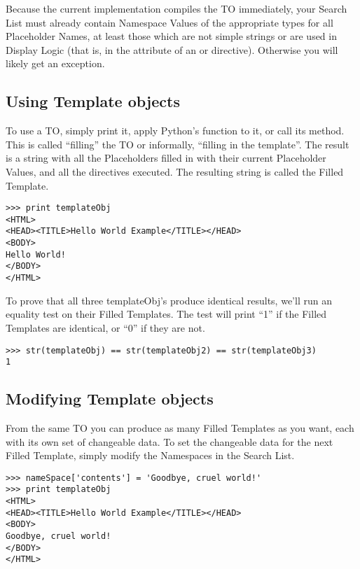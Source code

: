 Because the current implementation compiles the TO immediately, your Search 
List must already contain Namespace Values of the appropriate types for all
Placeholder Names, at least those which are not simple strings or are used
in Display Logic (that is, in the attribute of an  or 
directive).  Otherwise you will likely get an exception.


\subsection{Using Template objects}

To use a TO, simply print it, apply Python's
 function to it, or call its  method.  This is
called ``filling'' the TO or informally,  ``filling in the template''.  The
result is a string with all the Placeholders filled in with their current
Placeholder Values, and all the directives executed.  The resulting string is
called the Filled Template.

\begin{verbatim}
>>> print templateObj
<HTML>
<HEAD><TITLE>Hello World Example</TITLE></HEAD>
<BODY>
Hello World!
</BODY>
</HTML>
\end{verbatim}

To prove that all three templateObj's produce identical results, we'll run an
equality test on their Filled Templates.  The test will print ``1'' if the
Filled Templates are identical, or ``0'' if they are not.

\begin{verbatim}
>>> str(templateObj) == str(templateObj2) == str(templateObj3)
1
\end{verbatim}


\subsection{Modifying Template objects}

From the same TO you can produce as many Filled Templates as you
want, each with its own set of changeable data.  To set the changeable data for
the next Filled Template, simply modify the Namespaces in the Search List.

\begin{verbatim}
>>> nameSpace['contents'] = 'Goodbye, cruel world!'
>>> print templateObj
<HTML>
<HEAD><TITLE>Hello World Example</TITLE></HEAD>
<BODY>
Goodbye, cruel world!
</BODY>
</HTML>
\end{verbatim}

